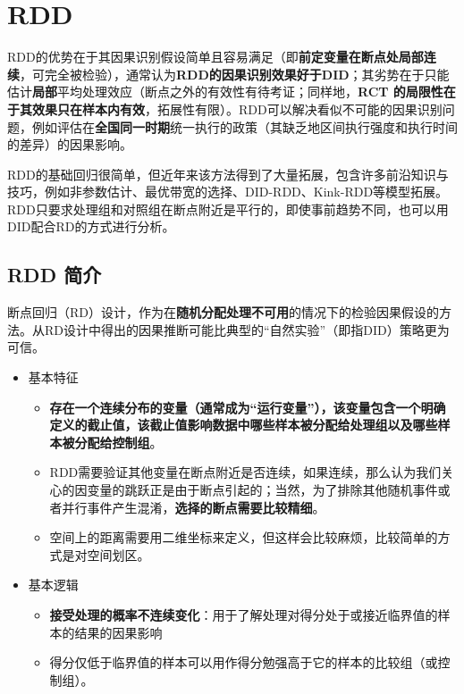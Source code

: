 \documentclass[11pt,a4paper]{ctexart}
\begin{document}
\section{RDD}

RDD的优势在于其因果识别假设简单且容易满足（即\textbf{前定变量在断点处局部连续}，可完全被检验），通常认为\textbf{RDD的因果识别效果好于DID}；其劣势在于只能估计\textbf{局部}平均处理效应（断点之外的有效性有待考证；同样地，\textbf{RCT
的局限性在于其效果只在样本内有效}，拓展性有限）。RDD可以解决看似不可能的因果识别问题，例如评估在\textbf{全国同一时期}统一执行的政策（其缺乏地区间执行强度和执行时间的差异）的因果影响。

RDD的基础回归很简单，但近年来该方法得到了大量拓展，包含许多前沿知识与技巧，例如非参数估计、最优带宽的选择、DID-RDD、Kink-RDD等模型拓展。RDD只要求处理组和对照组在断点附近是平行的，即使事前趋势不同，也可以用DID配合RD的方式进行分析。

\subsection{RDD 简介}

断点回归（RD）设计，作为在\textbf{随机分配处理不可用}的情况下的检验因果假设的方法。从RD设计中得出的因果推断可能比典型的``自然实验''（即指DID）策略更为可信。

\begin{itemize}
\item
  基本特征

  \begin{itemize}
  \item
    \textbf{存在一个连续分布的变量（通常成为``运行变量''），该变量包含一个明确定义的截止值，该截止值影响数据中哪些样本被分配给处理组以及哪些样本被分配给控制组}。
  \item
    RDD需要验证其他变量在断点附近是否连续，如果连续，那么认为我们关心的因变量的跳跃正是由于断点引起的；当然，为了排除其他随机事件或者并行事件产生混淆，\textbf{选择的断点需要比较精细}。
  \item
    空间上的距离需要用二维坐标来定义，但这样会比较麻烦，比较简单的方式是对空间划区。
  \end{itemize}
\item
  基本逻辑

  \begin{itemize}
  \item
    \textbf{接受处理的概率不连续变化}：用于了解处理对得分处于或接近临界值的样本的结果的因果影响
  \end{itemize}

  \begin{itemize}
  \item
    得分仅低于临界值的样本可以用作得分勉强高于它的样本的比较组（或控制组）。
  \end{itemize}
\end{itemize}
\end{document}
